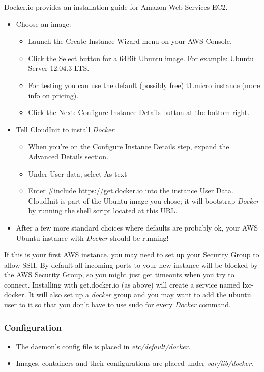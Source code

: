 \documentclass[11pt]{article}
\begin{document}
Docker.io provides an installation guide for Amazon Web Services EC2.
\begin{itemize}
\item Choose an image:
\begin{itemize}
\item Launch the Create Instance Wizard menu on your AWS Console.
\item Click the Select button for a 64Bit Ubuntu image. For example: Ubuntu Server 12.04.3 LTS.
\item For testing you can use the default (possibly free) t1.micro instance (more info on pricing).
\item Click the Next: Configure Instance Details button at the bottom right.
\end{itemize}
\item Tell CloudInit to install \emph{Docker}:
\begin{itemize}
\item When you're on the Configure Instance Details step, expand the Advanced Details section.
\item Under User data, select As text
\item Enter \#include \href{https://get.docker.io}{https://get.docker.io}  into the instance User Data. CloudInit is part of the Ubuntu image you chose; it will bootstrap \emph{Docker} by running the shell script located at this URL.
\end{itemize}
\item After a few more standard choices where defaults are probably ok, your AWS Ubuntu instance with \emph{Docker} should be running!
\end{itemize}
If this is your first AWS instance, you may need to set up your Security Group to allow SSH. By default all incoming ports to your new instance will be blocked by the AWS Security Group, so you might just get
timeouts when you try to connect. Installing with get.docker.io (as above) will create a service named lxc-
docker. It will also set up a \emph{docker} group and you may want to add the ubuntu user to it so that you don't have to use sudo for every \emph{Docker} command.
\subsubsection{Configuration}
\label{sec-2-2-5}

\begin{itemize}
\item The daemon's config file is placed in \emph{etc/default/docker}.
\item Images, containers and their configurations are placed under \emph{var/lib/docker}.
\end{itemize}
\end{document}
